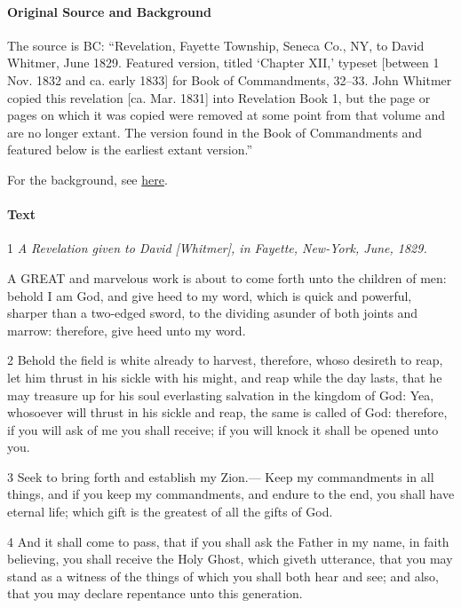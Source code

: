 			\paragraph{Original Source and Background}
			
				The source is BC: ``Revelation, Fayette Township, Seneca Co., NY, to David Whitmer, June 1829. Featured version, titled `Chapter XII,' typeset [between 1 Nov. 1832 and ca. early 1833] for Book of Commandments, 32--33. John Whitmer copied this revelation [ca. Mar. 1831] into Revelation Book 1, but the page or pages on which it was copied were removed at some point from that volume and are no longer extant. The version found in the Book of Commandments and featured below is the earliest extant version.''
				
				For the background, see \hyperref[DC14-HB]{here}.
			
			\paragraph{Text}
			
				1 \textit{A Revelation given to David [Whitmer], in Fayette, New-York, June, 1829.}

				A GREAT and marvelous work is about to come forth unto the children of men: behold I am God, and give heed to my word, which is quick and powerful, sharper than a two-edged sword, to the dividing asunder of both joints and marrow: therefore, give heed unto my word.

				2 Behold the field is white already to harvest, therefore, whoso desireth to reap, let him thrust in his sickle with his might, and reap while the day lasts, that he may treasure up for his soul everlasting salvation in the kingdom of God: Yea, whosoever will thrust in his sickle and reap, the same is called of God: therefore, if you will ask of me you shall receive; if you will knock it shall be opened unto you.

				3 Seek to bring forth and establish my Zion.--- Keep my commandments in all things, and if you keep my commandments, and endure to the end, you shall have eternal life; which gift is the greatest of all the gifts of God.

				4 And it shall come to pass, that if you shall ask the Father in my name, in faith believing, you shall receive the Holy Ghost, which giveth utterance, that you may stand as a witness of the things of which you shall both hear and see; and also, that you may declare repentance unto this generation.

